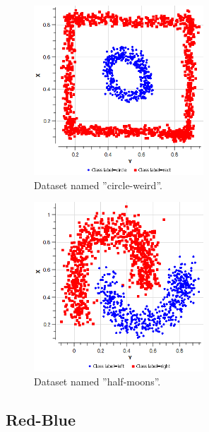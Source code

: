 \documentclass[conference]{IEEEtran}
\begin{document}
\begin{figure}[th]
\centering
\includegraphics[width=15pc]{circle-weird.png}
\caption{Dataset named ''circle-weird''.}
\label{dataset2}
\end{figure}

\begin{figure}[ht]
\centering
\includegraphics[width=15pc]{half-moons.png}
\caption{Dataset named ''half-moons''.}
\label{dataset3}
\end{figure}

\FloatBarrier


\subsection{Red-Blue}
\end{document}
